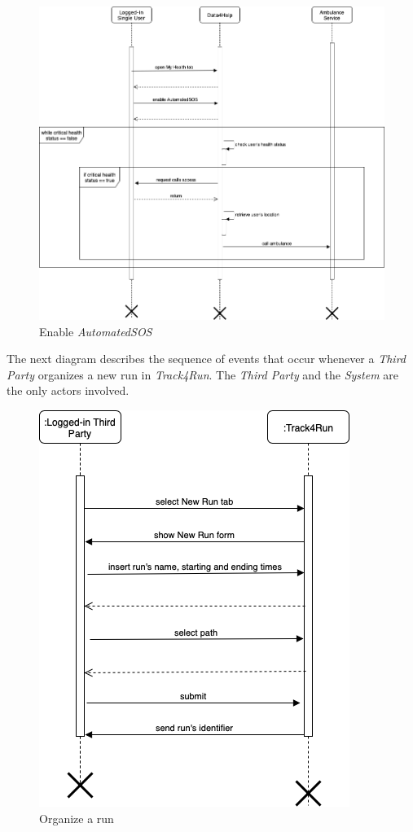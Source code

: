 \documentclass[titlepage]{article}
\begin{document}
\begin{figure}[H]
			\center
  			\includegraphics[width=\textwidth]{Diagrammi/sd5.png}
			\caption{Enable {\it AutomatedSOS}}
			\label{fig:sd5}
\end{figure}
The next diagram describes the sequence of events that occur whenever a {\it Third Party} organizes a new run in {\it Track4Run}. The {\it Third Party} and the {\it System} are the only actors involved.
\begin{figure}[H]
			\center
  			\includegraphics[width=\textwidth]{Diagrammi/sd6.png}
			\caption{Organize a run}
			\label{fig:sd6}
\end{figure}
\end{document}
